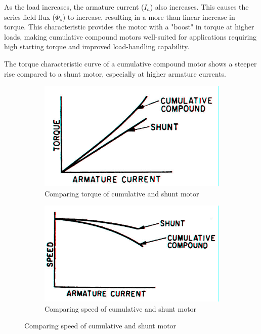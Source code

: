 \documentclass[a4paper,12pt]{article}
\begin{document}
		As the load increases, the armature current (\(I_a\)) also increases. This causes the series field flux (\(\Phi_s\)) to increase, resulting in a more than linear increase in torque. This characteristic provides the motor with a "boost" in torque at higher loads, making cumulative compound motors well-suited for applications requiring high starting torque and improved load-handling capability.
		
		The torque characteristic curve of a cumulative compound motor shows a steeper rise compared to a shunt motor, especially at higher armature currents.
		
	
		
			\begin{figure}[H]
			\centering
			\begin{subfigure}[t]{.48\textwidth}
				\centering
					\includegraphics[width=1\linewidth]{Images/screenshot001}
				\caption{Comparing torque of cumulative and shunt motor}
				\vspace{0.5cm}
			\end{subfigure}
			\hfill
			\begin{subfigure}[t]{.48\textwidth}
				\centering
				\includegraphics[width=1\linewidth]{Images/screenshot003}
			\caption{Comparing speed of cumulative and shunt motor}
			\end{subfigure}
			
			
		\end{figure}
		
\end{document}
